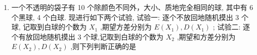\begin{enumerate}
\begin{enumerate}
\begin{jieda}
            随机变量${\xi }_{1}$ 服从超几何分布，随机变量 ${\xi }_{2}$ 服从二项分布，
            
            根据超几何分布的均值方差公式得:
            
            $n = 5,N = {20},M = 8$ ,即 $E\left( {\xi }_{1}\right)  = \dfrac{nM}{N} = \dfrac{5 \times  8}{20} = 2$ ,
            
            $D\left( {\xi }_{1}\right)  = \dfrac{nM}{N}\left( {1 - \dfrac{M}{N}}\right) \dfrac{N - n}{N - 1} = \dfrac{5 \times  8}{20} \times  \left( {1 - \dfrac{8}{20}}\right)  \times  \dfrac{{20} - 5}{{20} - 1} = 2 \times  \dfrac{3}{5} \times  \dfrac{15}{19} = \dfrac{18}{19}$
            
            根据超二项分布的均值方差公式得:
            
            $n = 5,p = \dfrac{8}{20} = \dfrac{2}{5}$ ,即 $E\left( {\xi }_{2}\right)  = {np} = 5 \times  \dfrac{2}{5} = 2$
            
            $D\left( {\xi }_{2}\right)  = {np}\left( {1 - p}\right)  = 5 \times  \dfrac{2}{5} \times  \dfrac{3}{5} = \dfrac{6}{5}$
            
            所以 $E\left( {\xi }_{1}\right)  = E\left( {\xi }_{2}\right) ,D\left( {\xi }_{1}\right)  < D\left( {\xi }_{2}\right)$ .
        \end{jieda}
        
        \item 一个不透明的袋子有 10 个除颜色不同外，大小、质地完全相同的球, 其中有 6 个黑球, 4 个白球. 现进行如下两个试验, 试验一: 逐个不放回地随机摸出 3 个球, 记取到白球的个数为 ${X}_{1}$ ,期望方差分别为 $E\left( {X}_{1}\right) ,D\left( {X}_{1}\right)$ ; 试验二: 逐个有放回地随机摸出 3 个球,记取到白球的个数为 ${X}_{2}$ ,期望和方差分别为 $E\left( {X}_{2}\right) ,D\left( {X}_{2}\right)$ ,则下列判断正确的是
    

\end{enumerate}
\end{enumerate}
